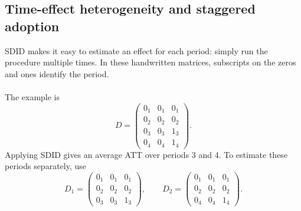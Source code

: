 \subsection{Time-effect heterogeneity and staggered adoption}
SDID makes it easy to estimate an effect for each period: simply run the procedure multiple times. In these handwritten matrices, subscripts on the zeros and ones identify the period.
\paragraph{}
The example is
\[
D=\begin{pmatrix}
0_1&0_1&0_1\\0_2&0_2&0_2\\0_3&0_3&1_3\\0_4&0_4&1_4
\end{pmatrix}.
\]
Applying SDID gives an average ATT over periods 3 and 4.
 To estimate these periods separately, use
\[
D_1=\begin{pmatrix}0_1&0_1&0_1\\0_2&0_2&0_2\\0_3&0_3&1_3\end{pmatrix},
\qquad
D_2=\begin{pmatrix}0_1&0_1&0_1\\0_2&0_2&0_2\\0_4&0_4&1_4\end{pmatrix}.
\]

